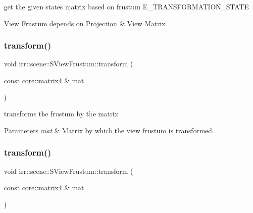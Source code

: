 get the given state\textquotesingle{}s matrix based on frustum E\+\_\+\+T\+R\+A\+N\+S\+F\+O\+R\+M\+A\+T\+I\+O\+N\+\_\+\+S\+T\+A\+TE 

View Frustum depends on Projection \& View Matrix \mbox{\label{structirr_1_1scene_1_1SViewFrustum_aeabadaf532f08ba3cb98b897ff0619f2}} 
\subsubsection{\texorpdfstring{transform()}{transform()}\hspace{0.1cm}{\footnotesize\ttfamily [1/2]}}
{\footnotesize\ttfamily void irr\+::scene\+::\+S\+View\+Frustum\+::transform (\begin{DoxyParamCaption}\item[{const \hyperlink{namespaceirr_1_1core_a4c9d4e29899535971052810954a14431}{core\+::matrix4} \&}]{mat }\end{DoxyParamCaption})}



transforms the frustum by the matrix 


\begin{DoxyParams}{Parameters}
{\em mat} & Matrix by which the view frustum is transformed. \\
\hline
\end{DoxyParams}
\mbox{\label{structirr_1_1scene_1_1SViewFrustum_aeabadaf532f08ba3cb98b897ff0619f2}} 
\subsubsection{\texorpdfstring{transform()}{transform()}\hspace{0.1cm}{\footnotesize\ttfamily [2/2]}}
{\footnotesize\ttfamily void irr\+::scene\+::\+S\+View\+Frustum\+::transform (\begin{DoxyParamCaption}\item[{const \hyperlink{namespaceirr_1_1core_a4c9d4e29899535971052810954a14431}{core\+::matrix4} \&}]{mat }\end{DoxyParamCaption})\hspace{0.3cm}{\ttfamily [inline]}}



